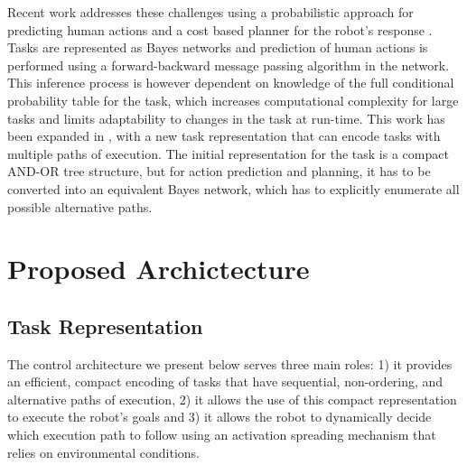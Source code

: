 \documentclass[conference]{article}
\begin{document}
Recent work  addresses these challenges using a probabilistic approach for predicting human actions and a cost based planner for the robot’s response \cite{hawkins2014anticipating}. Tasks are represented as Bayes networks and prediction of human actions is performed using a forward-backward message passing algorithm in the network. This inference process is however dependent on knowledge of the full conditional probability table for the task, which increases computational complexity for large tasks and limits adaptability to changes in the task at run-time. This work has been expanded in \cite{hawkins2013probabilistic}, with a new task representation that can encode tasks with multiple paths of execution. The initial representation for the task is a compact AND-OR tree structure, but for action prediction and planning, it has to be converted into an equivalent Bayes network, which has to explicitly enumerate all possible alternative paths. 
\section{Proposed Archictecture}
\label{architecture}
\subsection{Task Representation}
\label{representation}
The control architecture we present below serves three main roles: 1) it provides an efficient, compact encoding of tasks that have sequential, non-ordering, and alternative paths of execution, 2) it allows the use of this compact representation to execute the robot's goals and 3) it allows the robot to dynamically decide which execution path to follow using an activation spreading mechanism that relies on environmental conditions.
\end{document}
